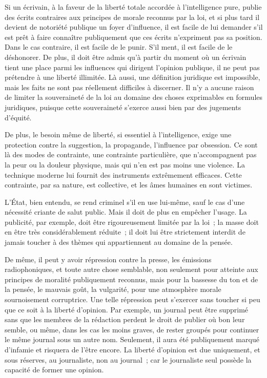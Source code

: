 \documentclass[french,twoside]{book} %
\begin{document}
Si un écrivain, à la faveur de la liberté totale accordée à l'intelligence pure, publie des écrits contraires aux principes de morale reconnus par la loi, et si plus tard il devient de notoriété publique un foyer d'influence, il est facile de lui demander s'il est prêt à faire connaître publiquement que ces écrits n'expriment pas sa position. Dans le cas contraire, il est facile de le punir. S'il ment, il est facile de le déshonorer. De plus, il doit être admis qu'à partir du moment où un écrivain tient une place parmi les influences qui dirigent l'opinion publique, il ne peut pas prétendre à une liberté illimitée. Là aussi, une définition juridique est impossible, mais les faits ne sont pas réellement difficiles à discerner. Il n'y a aucune raison de limiter la souveraineté de la loi au domaine des choses exprimables en formules juridiques, puisque cette souveraineté s'exerce aussi bien par des jugements d'équité.\par
De plus, le besoin même de liberté, si essentiel à l'intelligence, exige une protection contre la suggestion, la propagande, l'influence par obsession. Ce sont là des modes de contrainte, une contrainte particulière, que n'accompagnent pas la peur ou la douleur physique, mais qui n'en est pas moins une violence. La technique moderne lui fournit des instruments extrêmement efficaces. Cette contrainte, par sa nature, est collective, et les âmes humaines en sont victimes.\par
L'État, bien entendu, se rend criminel s'il en use lui-même, sauf le cas d'une nécessité criante de salut public. Mais il doit de plus en empêcher l'usage. La publicité, par exemple, doit être rigoureusement limitée par la loi ; la masse doit en être très considérablement réduite ; il doit lui être strictement interdit de jamais toucher à des thèmes qui appartiennent au domaine de la pensée.\par
De même, il peut y avoir répression contre la presse, les émissions radiophoniques, et toute autre chose semblable, non seulement pour atteinte aux principes de moralité publiquement reconnus, mais pour la bassesse du ton et de la pensée, le mauvais goût, la vulgarité, pour une atmosphère morale sournoisement corruptrice. Une telle répression peut s'exercer sans toucher si peu que ce soit à la liberté d'opinion. Par exemple, un journal peut être supprimé sans que les membres de la rédaction perdent le droit de publier où bon leur semble, ou même, dans les cas les moins graves, de rester groupés pour continuer le même journal sous un autre nom. Seulement, il aura été publiquement marqué d'infamie et risquera de l'être encore. La liberté d'opinion est due uniquement, et sous réserves, au journaliste, non au journal ; car le journaliste seul possède la capacité de former une opinion.\par
\end{document}
